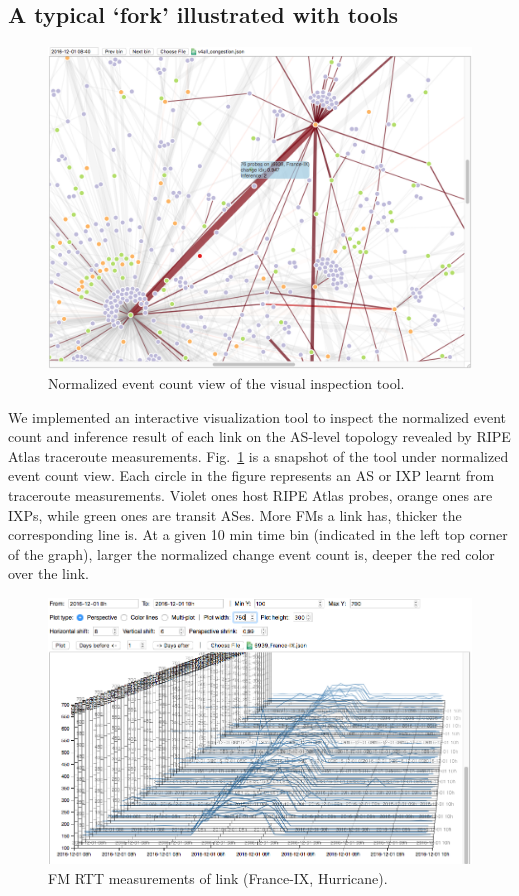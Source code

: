 \subsection{A typical `fork' illustrated with tools}
\begin{figure}[!htb]
\centering
\includegraphics[width=1\textwidth]{gfx/chap5/case_event_count.png}
\caption{Normalized event count view of the visual inspection tool.}
\label{fig:case_event_count}
\end{figure}

We implemented an interactive visualization tool to inspect the normalized event count and inference result of each link on the AS-level topology revealed by RIPE Atlas traceroute measurements.
Fig.~\ref{fig:case_event_count} is a snapshot of the tool under normalized event count view.
Each circle in the figure represents an AS or IXP learnt from traceroute measurements. Violet ones host RIPE Atlas probes, orange ones are IXPs, while green ones are transit ASes. More \acp{FM} a link has, thicker the corresponding line is. At a given 10 min time bin (indicated in the left top corner of the graph), larger the normalized change event count is, deeper the red color over the link.

\begin{figure}[!htb]
\centering
\includegraphics[width=1\textwidth]{gfx/chap5/case_multi_rtt.png}
\caption{\ac{FM} RTT measurements of link (France-IX, Hurricane).}
\label{fig:case_multi_rtt}
\end{figure}

